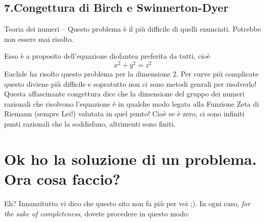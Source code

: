 \subsection{7.Congettura di Birch e Swinnerton-Dyer }
Teoria dei numeri – Questo problema è il più difficile di quelli enunciati. Potrebbe non essere mai risolto.

Esso è a proposito dell’equazione diofantea preferita da tutti, cioè
\[ x^2+y^2=z^2\]
Euclide ha risolto questo problema per la dimensione 2. Per curve più complicate questo diviene più difficile e sopratutto non ci sono metodi genrali per risolverlo! Questa affascinante congettura dice che la dimensione del gruppo dei numeri razionali che risolvono l’equazione è in qualche modo legata alla Funzione Zeta di Riemann (sempre Lei!) valutata in quel punto! Cioè se è zero, ci sono infiniti punti razionali che la soddisfano, altrimenti sono finiti.

\section{Ok ho la soluzione di un problema. Ora cosa faccio?}
Eh? Innanzitutto vi dico che questo sito non fa più per voi ;). In ogni caso, \emph{for the sake of completeness}, dovete procedere in questo modo:






